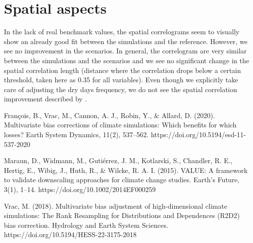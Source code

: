 \documentclass[letterpaper,10pt]{article}
\begin{document}
\section{Spatial aspects}
In the lack of real benchmark values, the spatial correlograms seem to visually show an already good fit between the simulations and the reference. However, we see no improvement in the scenarios. In general, the correlogram are very similar between the simulations and the scenarios and we see no significant change in the spatial correlation length (distance where the correlation drops below a certain threshold, taken here as 0.35 for all variables). Even though we explicitly take care of adjusting the dry days frequency, we do not see the spatial correlation improvement described by \cite{Francois2020}.

\begin{thebibliography}{6}
 François, B., Vrac, M., Cannon, A. J., Robin, Y., \& Allard, D. (2020). Multivariate bias corrections of climate simulations: Which benefits for which losses? Earth System Dynamics, 11(2), 537–562. https://doi.org/10.5194/esd-11-537-2020

 Maraun, D., Widmann, M., Gutiérrez, J. M., Kotlarski, S., Chandler, R. E., Hertig, E., Wibig, J., Huth, R., \& Wilcke, R. A. I. (2015). VALUE: A framework to validate downscaling approaches for climate change studies. Earth’s Future, 3(1), 1–14. https://doi.org/10.1002/2014EF000259

 Vrac, M. (2018). Multivariate bias adjustment of high-dimensional climate simulations: The Rank Resampling for Distributions and Dependences (R2D2) bias correction. Hydrology and Earth System Sciences. https://doi.org/10.5194/HESS-22-3175-2018


\end{thebibliography}
\end{document}
